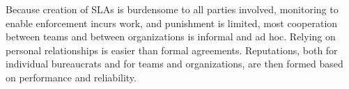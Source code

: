 Because creation of SLAs is burdensome to all parties involved, monitoring to enable enforcement incurs work, and punishment is limited, most cooperation between teams and between organizations is informal and ad hoc. Relying on personal relationships is easier than formal agreements. Reputations, both for individual bureaucrats and for teams and organizations, are then formed based on performance and reliability.



